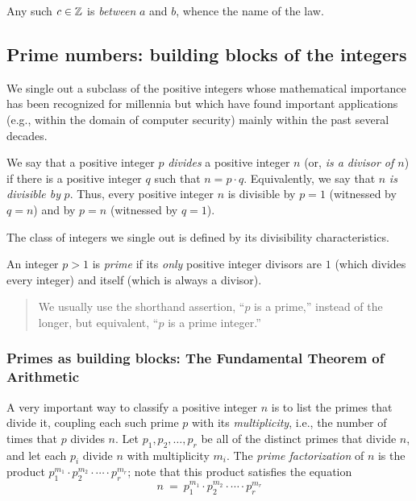 Any such $c \in \mathbb{Z}$ is {\em between} $a$ and $b$, whence the name of
the law.


\subsection{Prime numbers: building blocks of the integers}
\label{sec:primes}

We single out a subclass of the positive integers whose mathematical
importance has been recognized for millennia but which have found
important applications (e.g., within the domain of computer security)
mainly within the past several decades.

We say that a positive integer $p$ {\it divides} a positive integer
$n$ (or, {\it is a divisor of $n$}) if
there is a positive integer $q$ such that $n = p \cdot q$.
Equivalently, we say that $n$ {\it is divisible
  by} $p$.  Thus, every positive
integer $n$ is divisible by $p=1$ (witnessed by $q=n$) and by $p=n$
(witnessed by $q=1$).

The class of integers we single out is defined by its divisibility
characteristics.

An integer $p >1$ is {\it prime}
if its {\em only} positive integer divisors are $1$ (which divides
every integer) and itself (which is always a divisor).
\begin{quote}
We usually use the shorthand assertion, ``$p$ is a prime,'' instead of
the longer, but equivalent, ``$p$ is a prime integer.''
\end{quote}

\subsubsection{Primes as building blocks: The Fundamental Theorem of Arithmetic}
\label{sec:prime-factoriation}


A very important way to classify a positive integer $n$ is to list the
primes that divide it, coupling each such prime $p$ with its {\it
  multiplicity}, i.e., the number of times that $p$ divides $n$.  Let
$p_1, p_2, \ldots, p_r$ be all of the distinct primes that divide $n$,
and let each $p_i$ divide $n$ with multiplicity $m_i$.  The {\it prime
  factorization}
%
of $n$ is the product $p_1^{m_1} \cdot p_2^{m_2} \cdot \cdots \cdot
p_r^{m_r}$; note that this product satisfies the equation
\begin{equation}
\label{eq:prime-factorization}
n \ = \ p_1^{m_1} \cdot p_2^{m_2} \cdot \cdots \cdot p_r^{m_r}
\end{equation}

